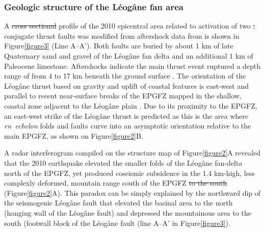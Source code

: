 \documentclass[linenumbers,draft]{agujournal}
\providecommand{\DIFadd}[1]{{\protect\color{blue}\uwave{#1}}} %
\providecommand{\DIFdel}[1]{{\protect\color{red}\sout{#1}}}                      %
\providecommand{\DIFaddbegin}{} %
\providecommand{\DIFaddend}{} %
\providecommand{\DIFdelbegin}{} %
\providecommand{\DIFdelend}{} %
\begin{document}
\subsubsection{Geologic structure of the L\'eog\^ane fan area}
A \DIFdelbegin \DIFdel{cross sectional }\DIFdelend \DIFaddbegin \DIFadd{cross-sectional }\DIFaddend profile of the 2010 epicentral area related to \DIFaddbegin \DIFadd{the }\DIFaddend activation of two \DIFdelbegin \DIFdel{, }\DIFdelend conjugate thrust faults was modified from aftershock data from \citet{douilly2013crustal,douilly2015three} is shown in Figure\DIFaddbegin \DIFadd{~}\DIFaddend \ref{figure3} (Line A--A'). Both faults are buried by about 1 km of late Quaternary sand and gravel of the L\'eog\^ane fan delta \citep{kocel2016near} and an additional 1 km of Paleocene limestone. Aftershocks indicate \DIFaddbegin \DIFadd{that }\DIFaddend the main thrust event ruptured a depth range of from 4 to 17 km beneath the ground surface \citep{douilly2013crustal,douilly2015three}. The orientation of the L\'eog\^ane thrust based on gravity and uplift of coastal features is east-west and parallel to recent near-surface breaks of the EPGFZ mapped in the shallow, coastal zone adjacent to the L\'eog\^ane plain \citep{hornbach2010high}. Due to its proximity to the EPGFZ, an east-west strike of the L\'eog\^ane thrust is predicted as this is the area where \textit{en~echelon} folds and faults curve into an asymptotic orientation relative to the main EPGFZ, as shown on Figure\DIFaddbegin \DIFadd{~}\DIFaddend \ref{figure2}B.

A radar interferogram compiled on the structure map of Figure\DIFaddbegin \DIFadd{~}\DIFaddend \ref{figure2}A revealed that the 2010 earthquake elevated the smaller folds of the L\'eog\^ane fan-delta north of the EPGFZ, yet produced coseismic subsidence in the 1.4 km-high, less complexly deformed, mountain range south of the EPGFZ \DIFdelbegin \DIFdel{to the south }\DIFdelend \citep{hashimoto2011fan} (Figure\DIFaddbegin \DIFadd{~}\DIFaddend \ref{figure2}A). This paradox can be simply explained by the northward dip of the seismogenic L\'eog\^ane fault that elevated the basinal area to the north (hanging wall of the L\'eog\^ane fault) and depressed the mountainous area to the south (footwall block of the L\'eog\^ane fault (line A--A' in Figure\DIFaddbegin \DIFadd{~}\DIFaddend \ref{figure3}). 
\end{document}
